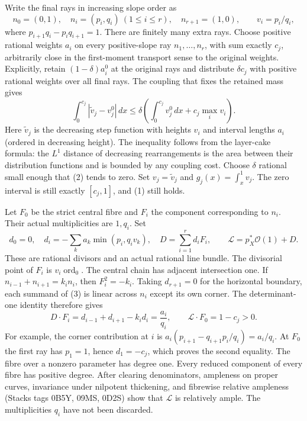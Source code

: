 \documentclass[11pt]{article}
\begin{document}
Write the final rays in increasing slope order as
\[
 n_0=(0,1),\quad n_i=(p_i,q_i)\ (1\le i\le r),
 \quad n_{r+1}=(1,0),\qquad v_i=p_i/q_i,
\]
where $p_{i+1}q_i-p_iq_{i+1}=1$.
There are finitely many extra rays. Choose positive rational weights
$a_i$ on every positive-slope ray $n_1,\ldots,n_r$, with sum exactly
$c_j$, arbitrarily close
in the first-moment transport sense to the original weights.
Explicitly, retain $(1-\delta)a_i^0$ at the original rays and distribute
$\delta c_j$ with positive rational weights over all final rays.
The coupling that fixes the retained mass gives
\[
 \int_0^{c_j}|\widetilde v_j-v_j^0|\,dx
 \le\delta\left(\int_0^{c_j}v_j^0\,dx
                    +c_j\max_i v_i\right).              \tag{2}
\]
Here $\widetilde v_j$ is the decreasing step function with heights
$v_i$ and interval lengths $a_i$ (ordered in decreasing height).
The inequality follows from the layer-cake formula: the $L^1$
distance of decreasing rearrangements is the area between their
distribution functions and is bounded by any coupling cost.
Choose $\delta$ rational small enough that (2) tends to zero.
Set $v_j=\widetilde v_j$ and $g_j(x)=\int_x^1v_j$. The zero interval
is still exactly $[c_j,1]$, and (1) still holds.

Let $F_0$ be the strict central fibre and $F_i$ the component
corresponding to $n_i$. Their actual multiplicities are $1,q_i$.
Set
\[
 d_0=0,\quad
 d_i=-\sum_k a_k\min(p_i,q_i v_k),\quad
 D=\sum_{i=1}^r d_iF_i,\qquad
 \mathcal L=p_X^*\mathcal O(1)+D.                         \tag{3}
\]
These are rational divisors and an actual rational line bundle.
The divisorial point of $F_i$ is $v_i\operatorname{ord}_0$.
The central chain has adjacent intersection one. If
$n_{i-1}+n_{i+1}=k_i n_i$, then $F_i^2=-k_i$.
Taking $d_{r+1}=0$ for the horizontal boundary, each summand of (3)
is linear across $n_i$ except its own corner. The determinant-one
identity therefore gives
\[
 D\cdot F_i=d_{i-1}+d_{i+1}-k_i d_i=\frac{a_i}{q_i},
 \qquad \mathcal L\cdot F_0=1-c_j>0.                     \tag{4}
\]
For example, the corner contribution at $i$ is
$a_i(p_{i+1}-q_{i+1}p_i/q_i)=a_i/q_i$.
At $F_0$ the first ray has $p_1=1$, hence $d_1=-c_j$,
which proves the second equality. The fibre over a nonzero parameter
has degree one. Every reduced component of every fibre has positive
degree. After clearing denominators, ampleness on proper curves,
invariance under nilpotent thickening, and fibrewise relative
ampleness (Stacks tags 0B5Y, 09MS, 0D2S) show that $\mathcal L$ is
relatively ample. The multiplicities $q_i$ have not been discarded.
\end{document}
